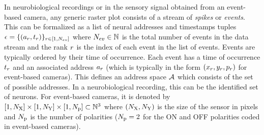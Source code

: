 \documentclass[default]{sn-jnl}%
\theoremstyle{thmstyleone}%
\theoremstyle{thmstyletwo}%
\theoremstyle{thmstylethree}%
\begin{document}
In neurobiological recordings or in the sensory signal obtained from an event-based camera, any generic raster plot consists of a stream of \emph{spikes} or \emph{events}. This can be formalized as a list of neural addresses and timestamps tuples $\epsilon = \{(a_r, t_r)\}_{r \in [1,N_{ev}]}$ where $N_{ev} \in \mathbb{N} $ is the total number of events in the data stream and the rank $r$ is the index of each event in the list of events. Events are typically ordered by their time of occurrence. Each event has a time of occurrence $t_r$ and an associated address $a_r$ (which is typically in the form $(x_r, y_r, p_r)$ for event-based cameras). This defines an address space $\mathcal{A}$ which consists of the set of possible addresses. In a neurobiological recording, this can be the identified set of neurons. For event-based cameras, it is denoted by $[1, N_\text{X}]\times[1, N_\text{Y}] \times [1, N_\text{p}] \subset \mathbb{N}^3$ where $(N_\text{X}, N_\text{Y})$ is the size of the sensor in pixels and $N_\text{p}$ is the number of polarities ($N_\text{p}=2$ for the ON and OFF polarities coded in event-based cameras). 
\end{document}
